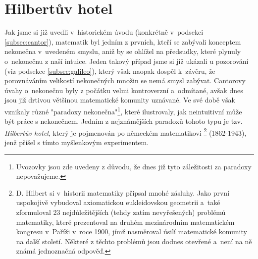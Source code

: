 \section{Hilbertův hotel}\label{sec:hilbertuv_hotel}
Jak jsme si již uvedli v~historickém úvodu (konkrétně v~podsekci \ref{subsec:cantor}), matematik  byl jedním z prvních, kteří se zabývali konceptem nekonečna v~uvedeném smyslu, aniž by se ohlížel na předsudky, které plynuly o~nekonečnu z naší intuice. Jeden takový případ jsme si již ukázali u pozorování  (viz podsekce \ref{subsec:galileo}), který však naopak dospěl k~závěru, že porovnáváním velikostí nekonečných množin se nemá smysl zabývat. Cantorovy úvahy o~nekonečnu byly z počátku velmi kontroverzní a~odmítané, avšak dnes jsou již drtivou většinou matematické komunity uznávané. Ve své době však vznikaly různé "paradoxy nekonečna"\footnote{Uvozovky jsou zde uvedeny z důvodu, že dnes již tyto záležitosti za paradoxy nepovažujeme.}, které ilustrovaly, jak neintuitivní může být práce s nekonečnem. Jedním z nejznámějších paradoxů tohoto typu je tzv. \emph{Hilbertův hotel}, který je pojmenován po německém matematikovi \footnote{D. Hilbert si v~historii matematiky připsal mnohé zásluhy. Jako první uspokojivě vybudoval axiomatickou eukleidovskou geometrii a~také zformuloval 23 nejdůležitějších (tehdy zatím nevyřešených) problémů matematiky, které prezentoval na druhém mezinárodním matematickém kongresu v~Paříži v~roce 1900, jímž nasměroval úsilí matematické komunity na další století. Některé z těchto problémů jsou dodnes otevřené a~není na ně známá jednoznačná odpověď.} \mbox{(1862-1943)}, jenž přišel s tímto myšlenkovým experimentem.
\medskip

